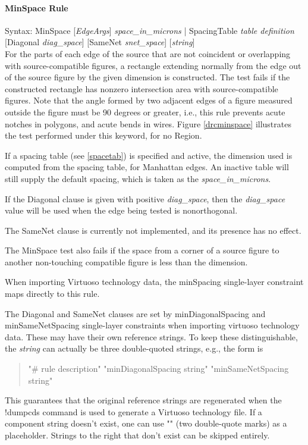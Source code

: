 \paragraph{{\et MinSpace} Rule}

\begin{description}
\item{Syntax: {\vt MinSpace} [{\it EdgeArgs\/}]
   {\it space\_in\_microns} {\vt |} {\vt SpacingTable} {\it table definition}
   [{\vt Diagonal} {\it diag\_space\/}]
   [{\vt SameNet} {\it snet\_space\/}] [{\it string\/}] }\\

For the parts of each edge of the source that are not coincident or
overlapping with source-compatible figures, a rectangle extending
normally from the edge out of the source figure by the given dimension
is constructed.  The test fails if the constructed rectangle has
nonzero intersection area with source-compatible figures.  Note that
the angle formed by two adjacent edges of a figure measured outside
the figure must be 90 degrees or greater, i.e., this rule prevents
acute notches in polygons, and acute bends in wires.  Figure
\ref{drcminspace} illustrates the test performed under this keyword,
for no {\et Region}.

If a spacing table (see \ref{spacetab}) is specified and active, the
dimension used is computed from the spacing table, for Manhattan
edges.  An inactive table will still supply the default spacing, which
is taken as the {\it space\_in\_microns\/}.

If the {\vt Diagonal} clause is given with positive {\it
diag\_space\/}, then the {\it diag\_space} value will be used when the
edge being tested is nonorthogonal.

The {\vt SameNet} clause is currently not implemented, and its
presence has no effect.

The {\et MinSpace} test also fails if the space from a corner of a
source figure to another non-touching compatible figure is less than
the dimension.

When importing Virtuoso technology data, the {\vt minSpacing}
single-layer constraint maps directly to this rule.

The {\vt Diagonal} and {\vt SameNet} clauses are set by {\vt
minDiagonalSpacing} and {\vt minSameNetSpacing} single-layer
constraints when importing virtuoso technology data.  These may have
their own reference strings.  To keep these distinguishable, the {\it
string} can actually be three double-quoted strings, e.g., the form is

\begin{quote}\vt
"\# rule description" "minDiagonalSpacing string" "minSameNetSpacing string"
\end{quote}

This guarantees that the original reference strings are regenerated
when the {\cb !dumpcds} command is used to generate a Virtuoso
technology file.  If a component string doesn't exist, one can use
{\vt ""} (two double-quote marks) as a placeholder.  Strings to the
right that don't exist can be skipped entirely.
\end{description}

